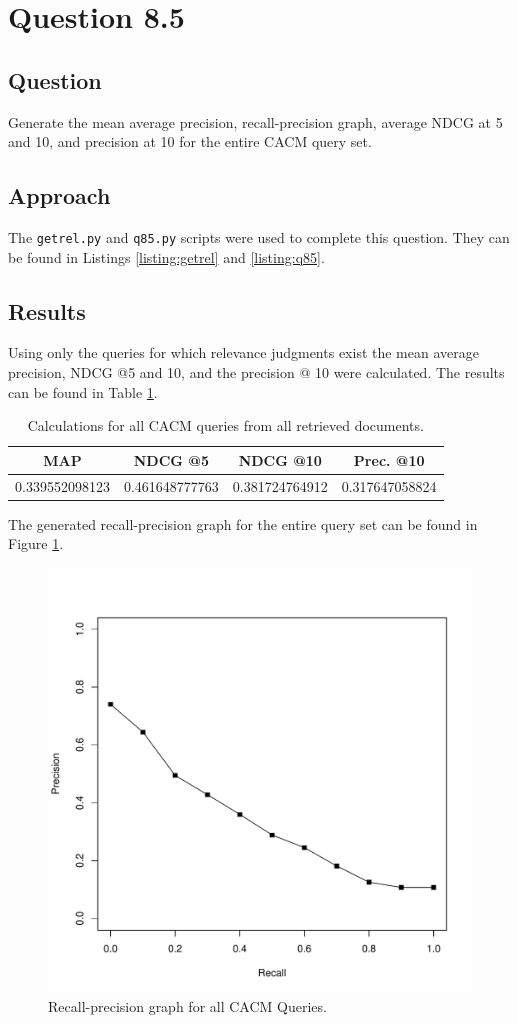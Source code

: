 \section{Question 8.5}

\subsection{Question}
Generate the mean average precision, recall-precision graph, average NDCG at 5 and 10, and precision at 10 for the entire CACM query set.

\subsection{Approach}
The \texttt{getrel.py} and \texttt{q85.py} scripts were used to complete this question. They can be found in Listings \ref{listing:getrel} and \ref{listing:q85}.

\subsection{Results}

Using only the queries for which relevance judgments exist the mean average precision, NDCG @5 and 10, and the precision @ 10 were calculated.  The results can be found in Table \ref{tab:q85}.

\begin{table}[h!]
\centering
\begin{tabular}{ | c | c | c | c | }
\hline
MAP & NDCG @5 & NDCG @10 & Prec. @10 \\
\hline
0.339552098123 & 0.461648777763 & 0.381724764912 & 0.317647058824 \\
\hline
\end{tabular}
\caption{Calculations for all CACM queries from all retrieved documents.}
\label{tab:q85}
\end{table}

The generated recall-precision graph for the entire query set can be found in Figure \ref{fig:overallavg}.

\begin{figure}[H]
\centering
\label{fig:overallavg}
\includegraphics[scale=.6]{code/getrel/avgq85.pdf}
\caption{Recall-precision graph for all CACM Queries.}
\end{figure}
